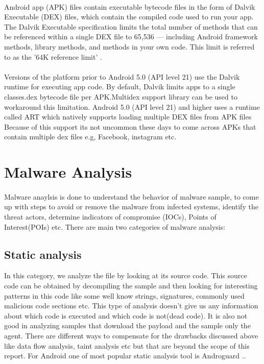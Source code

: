 \documentclass[../main.tex]{subfile}
\begin{document}
				\paragraph{}  Android app (APK) files contain executable bytecode files in the form of Dalvik Executable (DEX) files, which contain the compiled code used to run your app. The Dalvik Executable specification limits the total number of methods that can be referenced within a single DEX file to 65,536 — including Android framework methods, library methods, and methods in your own code. This limit is referred to as the '64K reference limit' \cite{multidex}.
				
				\paragraph{} Versions of the platform prior to Android 5.0 (API level 21) use the Dalvik runtime for executing app code. By default, Dalvik limits apps to a single classes.dex bytecode file per APK.Multidex support library can be used to workaround this limitation. Android 5.0 (API level 21) and higher uses a runtime called ART which natively supports loading multiple DEX files from APK files Because of this support its not uncommon these days to come across APKs that contain multiple dex files e.g, Facebook, instagram etc. \cite{multidex}
		\section{Malware Analysis}\label{sec:malware_analysis}
		\paragraph{} Malware anaylsis is done to understand the behavior of malware sample, to come up with steps to avoid or remove the malware from infected systems, identify the threat actors, determine indicators of compromise (IOCs), Points of Interest(POIs) etc. There are main two categories of malware analysis:
		\subsection[Static Analysis]{Static analysis} In this category, we analyze the file by looking at its source code. This source code can be obtained by decompiling the sample and then looking for interesting patterns in this code like some well know strings, signatures, commonly used malicious code sections etc. This type of analysis doesn't give us any information about which code is executed and which code is not(dead code). It is also not good in analyzing samples that download the payload and the sample only the agent. There are different ways to compensate for the drawbacks discussed above like data flow analysis, taint analysis etc but that are beyond the scope of this report. For Android one of most popular static analysis tool is Androguard \cite{desnos2017androguard}..
\end{document}
